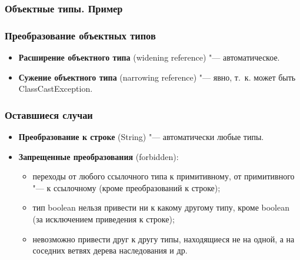 \documentclass[default]{beamer}
\begin{document}
	\begin{frame}
		\frametitle{Объектные типы. Пример}
		
		\lstCastingObjEx
	\end{frame}			

	\begin{frame}
		\frametitle{Преобразование объектных типов}
		
		\begin{itemize}
			\item \textbf{Расширение объектного типа} (widening reference) "--- автоматическое.
			\item \textbf{Сужение объектного типа} (narrowing reference) "--- явно, т.~к. может быть ClassCastException.
		\end{itemize}
		
		\lstCastingObj
	\end{frame}

	\begin{frame}
	\frametitle{Оставшиеся случаи}
	
		\begin{itemize}
			\item \textbf{Преобразование к строке} (String) "--- автоматически любые типы.
			\item \textbf{Запрещенные преобразования} (forbidden):
			\begin{itemize}
				\item переходы от любого ссылочного типа к примитивному, от примитивного "--- к ссылочному (кроме преобразований к строке);
				\item тип boolean нельзя привести ни к какому другому типу, кроме boolean (за исключением приведения к строке);
				\item невозможно привести друг к другу типы, находящиеся не на одной, а на соседних ветвях дерева наследования и др.
			\end{itemize}
		\end{itemize}
	\end{frame}	
	
\end{document}
